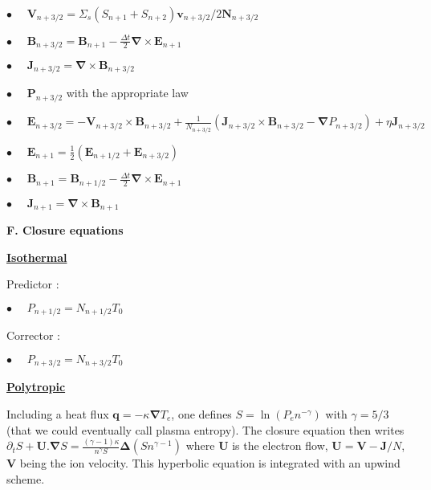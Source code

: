 \documentclass[a4paper,11pt]{letter}
\begin{document}
$\displaystyle \bullet \,\,\,\,\,\,\,\, \mathbf V_{n+3/2} = \Sigma_s (S_{n+1} + S_{n+2}) \mathbf v_{n+3/2} / 2 \mathbf N_{n+3/2} $

$\displaystyle \bullet \,\,\,\,\,\,\,\, \mathbf B_{n+3/2} = \mathbf B_{n+1} - \frac{\Delta t}{2} \boldsymbol{\nabla} \times \mathbf E_{n+1}$

$\displaystyle \bullet \,\,\,\,\,\,\,\, \mathbf J_{n+3/2} = \boldsymbol{\nabla} \times \mathbf B_{n+3/2}$

$\displaystyle \bullet \,\,\,\,\,\,\,\, \mathbf P_{n+3/2}$ with the appropriate law

$\displaystyle \bullet \,\,\,\,\,\,\,\, \mathbf E_{n+3/2} = - \mathbf V_{n+3/2} \times \mathbf B_{n+3/2} + \frac{1}{N_{n+3/2}} \left( \mathbf J_{n+3/2} \times \mathbf B_{n+3/2} - \boldsymbol{\nabla} P_{n+3/2} \right) + \eta \mathbf J_{n+3/2}$

$\displaystyle \bullet \,\,\,\,\,\,\,\, \mathbf E_{n+1} = \frac{1}{2}(\mathbf E_{n+1/2} + \mathbf E_{n+3/2})$

$\displaystyle \bullet \,\,\,\,\,\,\,\, \mathbf B_{n+1} = \mathbf B_{n+1/2} - \frac{\Delta t}{2} \boldsymbol{\nabla} \times \mathbf E_{n+1}$

$\displaystyle \bullet \,\,\,\,\,\,\,\, \mathbf J_{n+1} = \boldsymbol{\nabla} \times \mathbf B_{n+1}$

\newpage

{\bf F. Closure equations}

\bigskip

\underline{\bf Isothermal}

Predictor :

$\displaystyle \bullet \,\,\,\,\,\,\,\, P_{n+1/2} = N_{n+1/2} T_0$

Corrector :

$\displaystyle \bullet \,\,\,\,\,\,\,\, P_{n+3/2} = N_{n+3/2} T_0$

\bigskip

\underline{\bf Polytropic}

Including a heat flux $\mathbf q = - \kappa \boldsymbol{\nabla} T_e$, one defines $S = \ln (P_e n^{-\gamma})$ with $\gamma = 5/3$ (that we could eventually call plasma entropy). The closure equation then writes
$\displaystyle \partial_t S + \mathbf U . \boldsymbol{\nabla} S = \frac{(\gamma-1) \kappa}{n^{\gamma} S} \boldsymbol{\Delta} (S n^{\gamma-1})$ where $\mathbf U$ is the electron flow, $\mathbf U = \mathbf V - \mathbf J / N$, $\mathbf V$ being the ion velocity. This hyperbolic equation is integrated with an upwind scheme.
\end{document}
